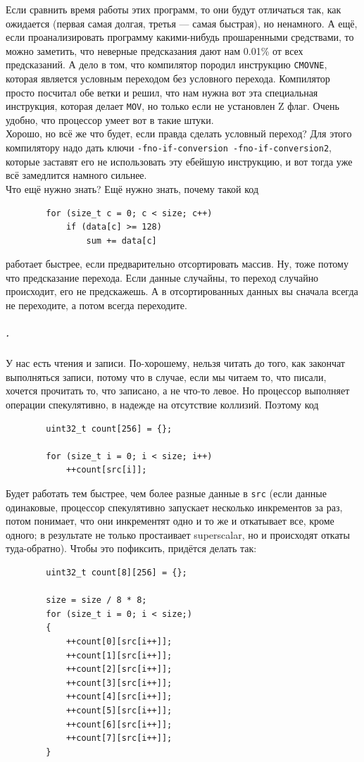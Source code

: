 \documentclass{article}
\newcommand{\asm}[1]{\texttt{#1}}
\begin{document}
    Если сравнить время работы этих программ, то они будут отличаться так, как ожидается (первая самая долгая, третья --- самая быстрая), но ненамного. А ещё, если проанализировать программу какими-нибудь прошаренными средствами, то можно заметить, что неверные предсказания дают нам 0.01\% от всех предсказаний. А дело в том, что компилятор породил инструкцию \asm{CMOVNE}, которая является условным переходом без условного перехода. Компилятор просто посчитал обе ветки и решил, что нам нужна вот эта специальная инструкция, которая делает \asm{MOV}, но только если не установлен Z флаг. Очень удобно, что процессор умеет вот в такие штуки.\\
    Хорошо, но всё же что будет, если правда сделать условный переход? Для этого компилятору надо дать ключи \texttt{-fno-if-conversion -fno-if-conversion2}, которые заставят его не использовать эту ебейшую инструкцию, и вот тогда уже всё замедлится намного сильнее.\\
    Что ещё нужно знать? Ещё нужно знать, почему такой код
    \begin{verbatim}
        for (size_t c = 0; c < size; c++)
            if (data[c] >= 128)
                sum += data[c]
    \end{verbatim}
    работает быстрее, если предварительно отсортировать массив. Ну, тоже потому что предсказание перехода. Если данные случайны, то переход случайно происходит, его не предскажешь. А в отсортированных данных вы сначала всегда не переходите, а потом всегда переходите.
    \subparagraph{.}
    У нас есть чтения и записи. По-хорошему, нельзя читать до того, как закончат выполняться записи, потому что в случае, если мы читаем то, что писали, хочется прочитать то, что записано, а не что-то левое. Но процессор выполняет операции спекулятивно, в надежде на отсутствие коллизий. Поэтому код
    \begin{verbatim}
        uint32_t count[256] = {};
        
        for (size_t i = 0; i < size; i++)
            ++count[src[i]];
    \end{verbatim}
    Будет работать тем быстрее, чем более разные данные в \texttt{src} (если данные одинаковые, процессор спекулятивно запускает несколько инкрементов за раз, потом понимает, что они инкрементят одно и то же и откатывает все, кроме одного; в результате не только простаивает superscalar, но и происходят откаты туда-обратно). Чтобы это пофиксить, придётся делать так:
    \begin{verbatim}
        uint32_t count[8][256] = {};
        
        size = size / 8 * 8;
        for (size_t i = 0; i < size;)
        {
            ++count[0][src[i++]];
            ++count[1][src[i++]];
            ++count[2][src[i++]];
            ++count[3][src[i++]];
            ++count[4][src[i++]];
            ++count[5][src[i++]];
            ++count[6][src[i++]];
            ++count[7][src[i++]];
        }
    \end{verbatim}
\end{document}
